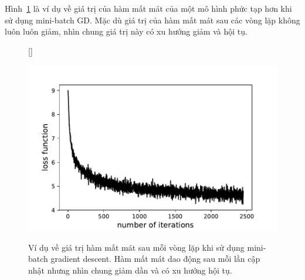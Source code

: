 Hình~\ref{fig:7_minibatch} là ví dụ về giá trị của hàm mất mát của một mô hình
phức tạp hơn khi sử dụng mini-batch GD. Mặc dù giá trị của hàm mất mát sau các
vòng lặp không luôn luôn giảm, nhìn chung giá trị này có xu hướng giảm và hội
tụ.

\begin{figure}[t]

[\FBwidth]
{\caption{
Ví dụ về giá trị hàm mất mát sau mỗi vòng lặp khi sử dụng mini-batch
gradient descent.
Hàm mất mát dao động sau mỗi lần cập
nhật nhưng nhìn chung giảm dần và có xu hướng hội tụ.
}
\label{fig:7_minibatch}}
{ %
\includegraphics[width=.65\textwidth]{ebookML_src/src/multiclasssvm/loss_history.pdf}
}
\end{figure}








